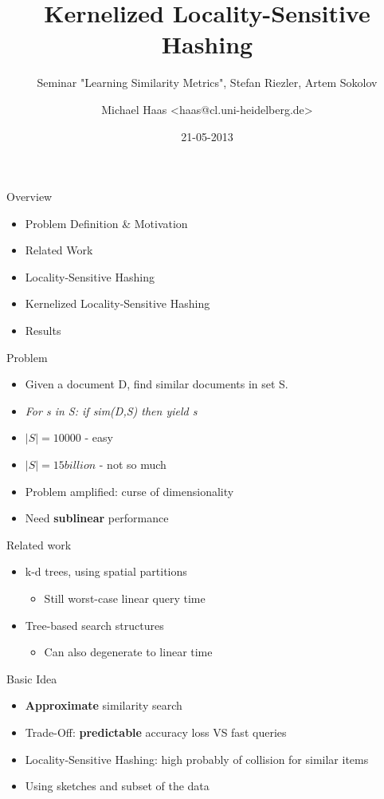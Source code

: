 \documentclass[12pt,a4paper]{beamer}
\author{Michael Haas <haas@cl.uni-heidelberg.de>}
\title{Kernelized Locality-Sensitive Hashing}
\subtitle{Seminar "Learning Similarity Metrics", Stefan Riezler, Artem Sokolov}
\date{21-05-2013}
\begin{document}
\begin{frame}
\maketitle
\end{frame}

\begin{frame}{Overview}
\begin{itemize}
\item Problem Definition & Motivation
\item Related Work
\item Locality-Sensitive Hashing
\item Kernelized Locality-Sensitive Hashing
\item Results
\end{itemize}
\end{frame}

\begin{frame}{Problem}
\begin{itemize}
\item Given a document D, find similar documents in set S.
\item \textit{For s in S: if sim(D,S) then yield s}
\item $|S| = 10000$ - easy
\item $|S| = 15 billion$ - not so much
\item Problem amplified: curse of dimensionality
\item Need \textbf{sublinear} performance
\end{itemize}
\end{frame}

\begin{frame}{Related work}
\begin{itemize}
\item k-d trees, using spatial partitions
    \begin{itemize}
    \item Still worst-case linear query time
    \end{itemize}
\item Tree-based search structures
    \begin{itemize}
    \item Can also degenerate to linear time
    \end{itemize}
\end{itemize}
\end{frame}

\begin{frame}{Basic Idea}
\begin{itemize}
\item \textbf{Approximate} similarity search
\item Trade-Off: \textbf{predictable} accuracy loss VS fast queries
\item Locality-Sensitive Hashing: high probably of collision for similar items
\item Using sketches and subset of the data
\end{itemize}
\end{frame}
\end{document}
